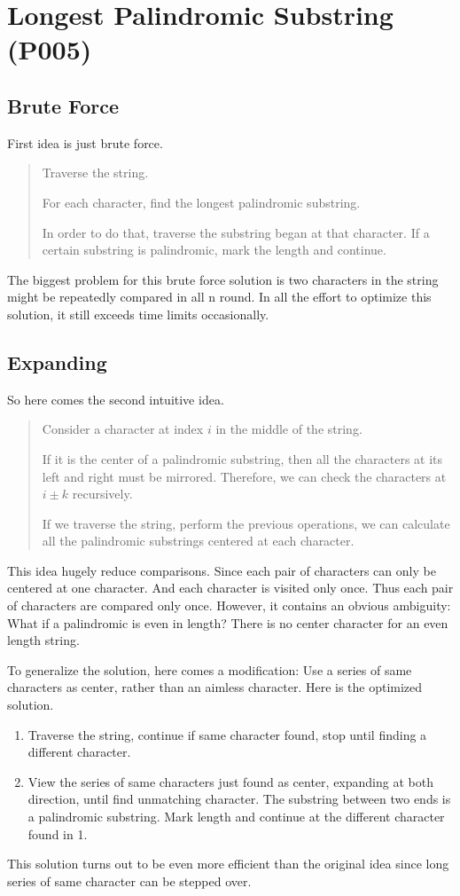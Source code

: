 \documentclass[varwidth]{standalone}
\begin{document}
\section{Longest Palindromic Substring (P005)}
\subsection{Brute Force}
First idea is just brute force.

\begin{quote}
    Traverse the string.

    For each character, find the longest palindromic substring.

    In order to do that, traverse the substring began at that character.
    If a certain substring is palindromic, mark the length and continue.
\end{quote}
The biggest problem for this brute force solution is two characters in
the string might be repeatedly compared in all n round.
In all the effort to optimize this solution, it still exceeds time limits
occasionally.

\subsection{Expanding}
So here comes the second intuitive idea.

\begin{quote}
    Consider a character at index $i$ in the middle of the string.

    If it is the center of a palindromic substring,
    then all the characters at its left and right must be mirrored.
    Therefore, we can check the characters at $i\pm k$ recursively.

    If we traverse the string, perform the previous operations,
    we can calculate all the palindromic substrings centered at each character.
\end{quote}
This idea hugely reduce comparisons. Since each pair of characters can only
be centered at one character. And each character is visited only once.
Thus each pair of characters are compared only once.
However, it contains an obvious ambiguity: What if a palindromic is even in
length? There is no center character for an even length string.

To generalize the solution, here comes a modification:
Use a series of same characters as center, rather than an aimless character.
Here is the optimized solution.
\begin{enumerate}
    \item Traverse the string, continue if same character found, stop until finding
    a different character.

    \item View the series of same characters just found as center, expanding at both
    direction, until find unmatching character. The substring between two ends
    is a palindromic substring. Mark length and continue at the different
    character found in 1.
\end{enumerate}
This solution turns out to be even more efficient than the original idea since long
series of same character can be stepped over.
\end{document}
